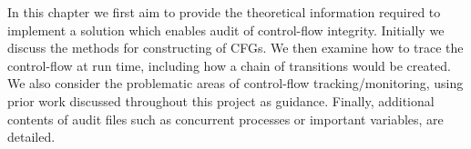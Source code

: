 In this chapter we first aim to provide the theoretical information required to implement a solution which enables audit of control-flow integrity. Initially we discuss the methods for constructing of CFGs. We then examine how to trace the control-flow at run time, including how a chain of transitions would be created. We also consider the problematic areas of control-flow tracking\slash monitoring, using prior work discussed throughout this project as guidance. Finally, additional contents of audit files such as concurrent processes or important variables, are detailed.